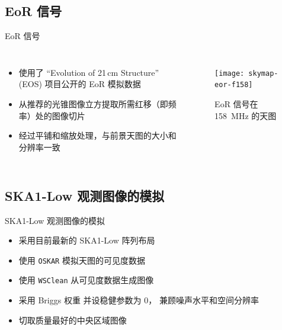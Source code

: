 \documentclass{beamer}
\begin{document}
\subsection{EoR 信号}

\begin{frame}{EoR 信号}
  \begin{columns}
    \begin{itemize}
      \item 使用了 \enquote{Evolution of 21\,cm Structure} (EOS)
        项目公开的 EoR 模拟数据
      \item 从推荐的光锥图像立方提取所需红移（即频率）处的图像切片
      \item 经过平铺和缩放处理，与前景天图的大小和分辨率一致
    \end{itemize}

    \begin{figure}
      \centering
      \texttt{[image: skymap-eor-f158]}
      \caption{EoR 信号在 \SI{158}{\MHz} 的天图}
    \end{figure}
  \end{columns}
\end{frame}

\subsection{SKA1-Low 观测图像的模拟}

\begin{frame}{SKA1-Low 观测图像的模拟}
  \begin{itemize}
    \item 采用目前最新的 \alert{SKA1-Low 阵列布局}
    \item 使用 \texttt{OSKAR} 模拟天图的\alert{可见度数据}
    \item 使用 \texttt{WSClean} 从可见度数据生成图像
    \item 采用 Briggs 权重 \cite{briggs1995} 并设稳健参数为 0，
      兼顾噪声水平和空间分辨率
    \item 切取质量最好的中央区域图像
  \end{itemize}
\end{frame}
\end{document}
